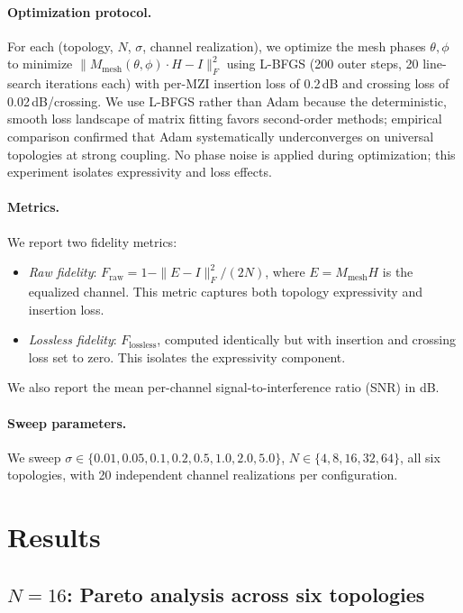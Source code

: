 \documentclass[11pt,a4paper]{article}
\begin{document}
\paragraph{Optimization protocol.}
For each (topology, $N$, $\sigma$, channel realization), we optimize
the mesh phases $\theta, \phi$ to minimize
$\|M_{\mathrm{mesh}}(\theta,\phi) \cdot H - I\|_F^2$
using L-BFGS (200 outer steps, 20 line-search iterations each) with
per-MZI insertion loss of 0.2\,dB and crossing loss of 0.02\,dB/crossing.
We use L-BFGS rather than Adam because the deterministic, smooth loss
landscape of matrix fitting favors second-order methods; empirical
comparison confirmed that Adam systematically underconverges on
universal topologies at strong coupling.
No phase noise is applied during optimization; this experiment isolates
expressivity and loss effects.

\paragraph{Metrics.}
We report two fidelity metrics:
\begin{itemize}
  \item \emph{Raw fidelity}: $F_{\mathrm{raw}} = 1 - \|E - I\|_F^2 / (2N)$,
        where $E = M_{\mathrm{mesh}} H$ is the equalized channel.
        This metric captures both topology expressivity and insertion loss.
  \item \emph{Lossless fidelity}: $F_{\mathrm{lossless}}$, computed
        identically but with insertion and crossing loss set to zero.
        This isolates the expressivity component.
\end{itemize}
We also report the mean per-channel signal-to-interference ratio (SNR)
in dB.

\paragraph{Sweep parameters.}
We sweep $\sigma \in \{0.01, 0.05, 0.1, 0.2, 0.5, 1.0, 2.0, 5.0\}$,
$N \in \{4, 8, 16, 32, 64\}$, all six topologies, with 20 independent
channel realizations per configuration.


\section{Results}
\label{sec:results}

\subsection{$N{=}16$: Pareto analysis across six topologies}
\label{sec:n16}
\end{document}
